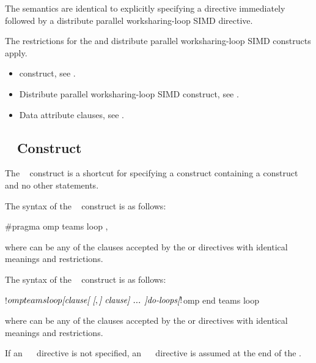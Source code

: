 \descr
The semantics are identical to explicitly specifying a  directive immediately
followed by a distribute parallel worksharing-loop SIMD directive. 

\restrictions
The restrictions for the  and distribute parallel worksharing-loop
SIMD constructs apply.

\crossreferences
\begin{itemize}
\item {} construct, see
.

\item Distribute parallel worksharing-loop SIMD construct, see
.

\item Data attribute clauses, see
.
\end{itemize}










\subsection{~ Construct}
\label{subsec:teams loop Construct}
\summary
The ~ construct is a shortcut for specifying a  construct
containing a  construct and no other statements.

\syntax
\begin{ccppspecific}
The syntax of the ~ construct is as follows:

\begin{ompcPragma}
#pragma omp teams loop \plc{[clause[ [},\plc{] clause] ... ] new-line}
\end{ompcPragma}

where  can be any of the clauses accepted by the  or
   directives with identical meanings and restrictions.
\end{ccppspecific}

\begin{fortranspecific}
The syntax of the ~ construct is as follows:

\begin{ompfPragma}
!$omp teams loop \plc{[clause[ [},\plc{] clause] ... ]}
    \plc{do-loops}
\plc{[}!$omp end teams loop\plc{]}
\end{ompfPragma}

where  can be any of the clauses accepted by the  or
directives with identical meanings and restrictions.

If an ~~ directive is not specified, an
~~ directive is assumed at the end of the .
\end{fortranspecific}

